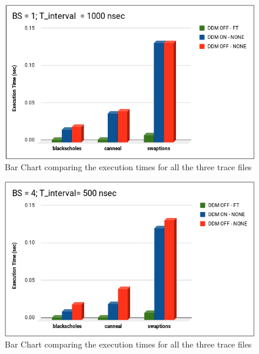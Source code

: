 \documentclass{listhesis}
\begin{document}
\begin{figure}
  \includegraphics[width=\linewidth]{Bla_cann_Swap_BS_1_T_1000.png}
  \centering
  \caption{Bar Chart comparing the execution times for all the three trace files}
  \label{fig:Bla_cann_Swap_BS_1_T_1000.png}
\end{figure}

\begin{figure}
  \includegraphics[width=\linewidth]{Bla_cann_Swap_BS_4_T_500.png}
  \centering
  \caption{Bar Chart comparing the execution times for all the three trace files}
  \label{fig:Bla_cann_Swap_BS_4_T_500.png}
\end{figure}
\end{document}
